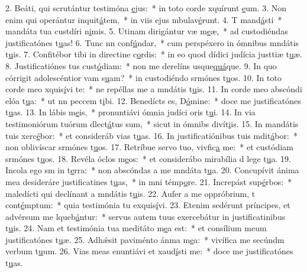 2. Beáti, qui scrutántur testimóna \uline{e}jus:~* in toto corde xquírunt \uline{e}um.
3. Non enim qui operántur inquit\uline{á}tem,~* in viis ejus mbulav\uline{é}runt.
4. T mand\uline{á}sti~* mandáta tua custdíri n\uline{i}mis.
5. Utinam dirigántur væ m\uline{e}æ,~* ad custodiéndas justificatónes t\uline{u}as!
6. Tunc nn conf\uline{ú}ndar,~* cum perspéxero in ómnibus mndátis t\uline{u}is.
7. Confitébor tibi in directine c\uline{o}rdis:~* in eo quod dídici judícia justtiæ t\uline{u}æ.
8. Justificatiónes tus cust\uline{ó}diam:~* non me derelíns usque\uline{quá}que.
9. In quo córrigit adolescéntior vam s\uline{u}am?~* in custodiéndo srmónes t\uline{u}os.
10. In toto corde meo xquis\uline{í}vi te:~* ne repéllas me a mndátis t\uline{u}is.
11. In corde meo abscóndi elóa t\uline{u}a:~* ut nn peccem t\uline{i}bi.
12. Benedícts es, D\uline{ó}mine:~* doce me justificatónes t\uline{u}as.
13. In lábis m\uline{e}is,~* pronuntiávi ómnia judíci oris t\uline{u}i.
14. In via testimoniórum tuórum dlect\uline{á}tus sum,~* sicut in ómnibs divít\uline{i}is.
15. In mandátis tuis xerc\uline{é}bor:~* et consideráb vias t\uline{u}as.
16. In justificatiónibus tuis mdit\uline{á}bor:~* non oblivíscar srmónes t\uline{u}os.
17. Retríbue servo tuo, vivfic\uline{a} me:~* et custódiam srmónes t\uline{u}os.
18. Revéla óclos m\uline{e}os:~* et considerábo mirabília d lege t\uline{u}a.
19. Incola ego sm in t\uline{e}rra:~* non abscóndas a me mndáta t\uline{u}a.
20. Concupívit ánima mea desideráre justificatines t\uline{u}as,~* in mni témp\uline{o}re.
21. Increpást sup\uline{é}rbos:~* maledícti qui declínant a mndátis t\uline{u}is.
22. Aufer a me oppróbrium, t cont\uline{é}mptum:~* quia testimónia tu exquis\uline{í}vi.
23. Etenim sedérunt príncipes, et advérsum me lqueb\uline{á}ntur:~* servus autem tuus exercebátur in justificatinibus t\uline{u}is.
24. Nam et testimónia tua meditáto m\uline{e}a est:~* et consílium meum justificatónes t\uline{u}æ.
25. Adhǽsit paviménto ánma m\uline{e}a:~* vivífica me secúndm verbum t\uline{u}um.
26. Vias meas enuntiávi et xaud\uline{í}sti me:~* doce me justificatónes t\uline{u}as.
